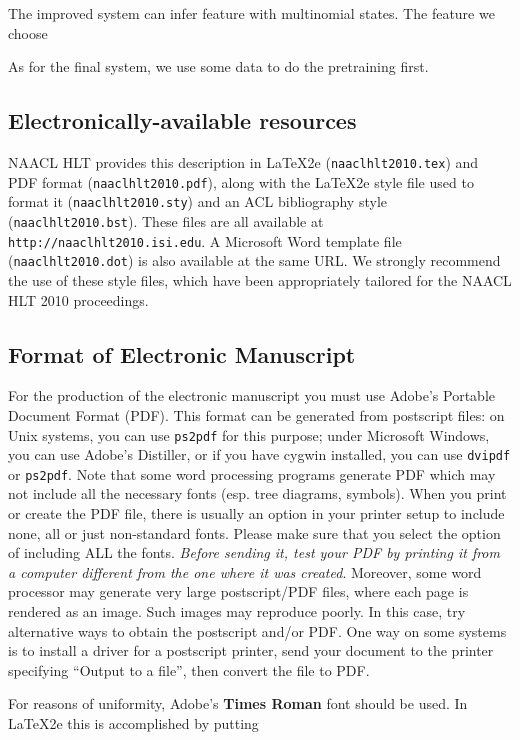 \documentclass[11pt,letterpaper]{article}
\begin{document}
The improved system can infer feature with multinomial states. The feature we choose 


As for the final system, we use some data to do the pretraining first.


\subsection{Electronically-available resources}

NAACL HLT provides this description in \LaTeX2e{} ({\tt naaclhlt2010.tex}) and PDF
format ({\tt naaclhlt2010.pdf}), along with the \LaTeX2e{} style file used to
format it ({\tt naaclhlt2010.sty}) and an ACL bibliography style ({\tt naaclhlt2010.bst}).
These files are all available at
{\tt http://naaclhlt2010.isi.edu}.  A Microsoft Word
template file ({\tt naaclhlt2010.dot}) is also available at the same URL. We
strongly recommend the use of these style files, which have been
appropriately tailored for the NAACL HLT 2010 proceedings.


\subsection{Format of Electronic Manuscript}
\label{sect:pdf}

For the production of the electronic manuscript you must use Adobe's
Portable Document Format (PDF). This format can be generated from
postscript files: on Unix systems, you can use {\tt ps2pdf} for this
purpose; under Microsoft Windows, you can use Adobe's Distiller, or
if you have cygwin installed, you can use {\tt dvipdf} or
{\tt ps2pdf}.  Note 
that some word processing programs generate PDF which may not include
all the necessary fonts (esp. tree diagrams, symbols). When you print
or create the PDF file, there is usually an option in your printer
setup to include none, all or just non-standard fonts.  Please make
sure that you select the option of including ALL the fonts.  {\em
  Before sending it, test your {\/\em PDF} by printing it from a
  computer different from the one where it was created}. Moreover,
some word processor may generate very large postscript/PDF files,
where each page is rendered as an image. Such images may reproduce
poorly.  In this case, try alternative ways to obtain the postscript
and/or PDF.  One way on some systems is to install a driver for a
postscript printer, send your document to the printer specifying
``Output to a file'', then convert the file to PDF.

For reasons of uniformity, Adobe's {\bf Times Roman} font should be
used. In \LaTeX2e{} this is accomplished by putting
\end{document}
